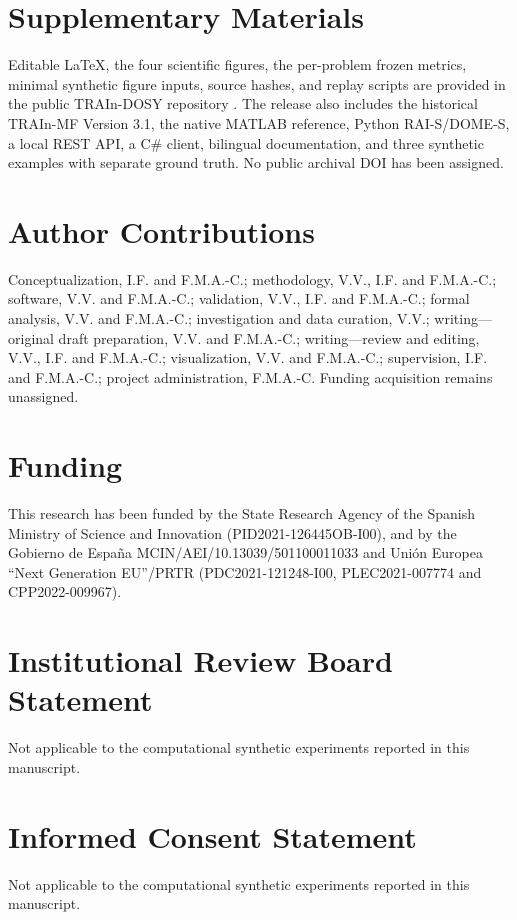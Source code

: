 \section*{Supplementary Materials}
Editable LaTeX, the four scientific figures, the per-problem frozen metrics, minimal synthetic figure inputs, source hashes, and replay scripts are provided in the public TRAIn-DOSY repository \cite{software}. The release also includes the historical TRAIn-MF Version 3.1, the native MATLAB reference, Python RAI-S/DOME-S, a local REST API, a C\# client, bilingual documentation, and three synthetic examples with separate ground truth. No public archival DOI has been assigned.

\section*{Author Contributions}

Conceptualization, I.F. and F.M.A.-C.; methodology, V.V., I.F. and F.M.A.-C.; software, V.V. and F.M.A.-C.; validation, V.V., I.F. and F.M.A.-C.; formal analysis, V.V. and F.M.A.-C.; investigation and data curation, V.V.; writing---original draft preparation, V.V. and F.M.A.-C.; writing---review and editing, V.V., I.F. and F.M.A.-C.; visualization, V.V. and F.M.A.-C.; supervision, I.F. and F.M.A.-C.; project administration, F.M.A.-C. Funding acquisition remains unassigned.

\section*{Funding}
This research has been funded by the State Research Agency of the Spanish Ministry of Science and Innovation (PID2021-126445OB-I00), and by the Gobierno de Espa\~na MCIN/AEI/10.13039/501100011033 and Uni\'on Europea ``Next Generation EU''/PRTR (PDC2021-121248-I00, PLEC2021-007774 and CPP2022-009967).

\section*{Institutional Review Board Statement}
Not applicable to the computational synthetic experiments reported in this manuscript.

\section*{Informed Consent Statement}
Not applicable to the computational synthetic experiments reported in this manuscript.

